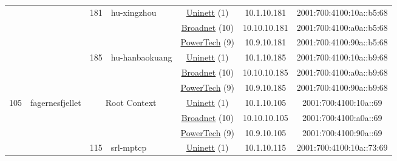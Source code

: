 \begin{small}
\begin{center}
\begin{longtable}{|c|c|c|c|c|c|c|c|}
  &  & \multirow{3}{*}{\tiny{181}} & \multicolumn{1}{|l|}{\multirow{3}{*}{\tiny{hu-xingzhou}}} & \multicolumn{2}{|c|}{\tiny{\href{https://www.uninett.no}{Uninett} (1)}} & \tiny{10.1.10.181} & \tiny{2001:700:4100:10a::b5:68} \\* \cline{5-5}\cline{6-6}\cline{7-7}\cline{8-8}
  &  &  &  & \multicolumn{2}{|c|}{\tiny{\href{https://www.broadnet.no}{Broadnet} (10)}} & \tiny{10.10.10.181} & \tiny{2001:700:4100:a0a::b5:68} \\* \cline{5-5}\cline{6-6}\cline{7-7}\cline{8-8}
  &  &  &  & \multicolumn{2}{|c|}{\tiny{\href{http://www.powertech.no}{PowerTech} (9)}} & \tiny{10.9.10.181} & \tiny{2001:700:4100:90a::b5:68} \\* \cline{3-3}\cline{4-4}\cline{5-5}\cline{6-6}\cline{7-7}\cline{8-8}
  &  & \multirow{3}{*}{\tiny{185}} & \multicolumn{1}{|l|}{\multirow{3}{*}{\tiny{hu-hanbaokuang}}} & \multicolumn{2}{|c|}{\tiny{\href{https://www.uninett.no}{Uninett} (1)}} & \tiny{10.1.10.185} & \tiny{2001:700:4100:10a::b9:68} \\* \cline{5-5}\cline{6-6}\cline{7-7}\cline{8-8}
  &  &  &  & \multicolumn{2}{|c|}{\tiny{\href{https://www.broadnet.no}{Broadnet} (10)}} & \tiny{10.10.10.185} & \tiny{2001:700:4100:a0a::b9:68} \\* \cline{5-5}\cline{6-6}\cline{7-7}\cline{8-8}
  &  &  &  & \multicolumn{2}{|c|}{\tiny{\href{http://www.powertech.no}{PowerTech} (9)}} & \tiny{10.9.10.185} & \tiny{2001:700:4100:90a::b9:68} \\ \hline
 \multirow{33}{*}{\tiny{105}} & \multicolumn{1}{|l|}{\multirow{33}{*}{\tiny{fagernesfjellet}}} & \multicolumn{2}{|c|}{\multirow{3}{*}{\tiny{Root Context}}} & \multicolumn{2}{|c|}{\tiny{\href{https://www.uninett.no}{Uninett} (1)}} & \tiny{10.1.10.105} & \tiny{2001:700:4100:10a::69} \\* \cline{5-5}\cline{6-6}\cline{7-7}\cline{8-8}
  &  & \multicolumn{2}{|c|}{} & \multicolumn{2}{|c|}{\tiny{\href{https://www.broadnet.no}{Broadnet} (10)}} & \tiny{10.10.10.105} & \tiny{2001:700:4100:a0a::69} \\* \cline{5-5}\cline{6-6}\cline{7-7}\cline{8-8}
  &  & \multicolumn{2}{|c|}{} & \multicolumn{2}{|c|}{\tiny{\href{http://www.powertech.no}{PowerTech} (9)}} & \tiny{10.9.10.105} & \tiny{2001:700:4100:90a::69} \\* \cline{3-3}\cline{4-4}\cline{5-5}\cline{6-6}\cline{7-7}\cline{8-8}
  &  & \multirow{3}{*}{\tiny{115}} & \multicolumn{1}{|l|}{\multirow{3}{*}{\tiny{srl-mptcp}}} & \multicolumn{2}{|c|}{\tiny{\href{https://www.uninett.no}{Uninett} (1)}} & \tiny{10.1.10.115} & \tiny{2001:700:4100:10a::73:69} \\* \cline{5-5}\cline{6-6}\cline{7-7}\cline{8-8}

\end{longtable}
\end{center}
\end{small}
